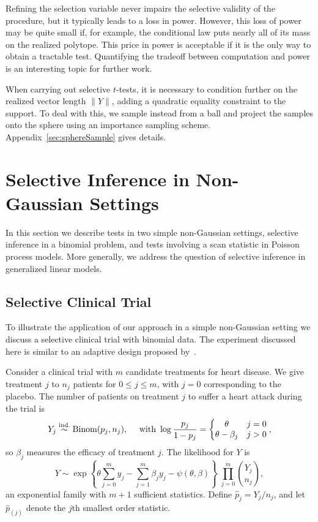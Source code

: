 \documentclass{article}
\theoremstyle{definition}
\begin{document}
Refining the selection variable never impairs the selective validity of the procedure, but it typically leads to a loss in power. However, this loss of power may be quite small if, for example, the conditional law puts nearly all of its mass on the realized polytope. This price in power is acceptable if it is the only way to obtain a tractable test. Quantifying the tradeoff between computation and power is an interesting topic for further work.

When carrying out selective $t$-tests, it is necessary to condition further on the realized vector length $\|Y\|$, adding a quadratic equality constraint to the support. To deal with this, we sample instead from a ball and project the samples onto the sphere using an importance sampling scheme. Appendix~\ref{sec:sphereSample} gives details.


\section{Selective Inference in Non-Gaussian Settings}\label{sec:examples}

In this section we describe tests in two simple non-Gaussian settings, selective inference in a binomial problem, and tests involving a scan statistic in Poisson process models. More generally, we address the question of selective inference in generalized linear models.

\subsection{Selective Clinical Trial}\label{sec:clinical}

To illustrate the application of our approach in a simple non-Gaussian setting we discuss a selective clinical trial with binomial data. The experiment discussed here is similar to an adaptive design proposed by~\citet{sill2009drop}.

Consider a clinical trial with $m$ candidate treatments for heart disease. We give treatment $j$ to $n_j$ patients for $0 \leq j \leq m$, with $j=0$ corresponding to the placebo. The number of patients on treatment $j$ to suffer a heart attack during the trial is
\begin{equation}
  Y_j \overset{\textrm{ind.}}{\sim} \text{Binom}(p_j, n_j), \quad \text{ with }   \log \frac{p_j}{1-p_j} = \left\{\begin{matrix} \theta & j = 0\\ \theta - \beta_j & j > 0\end{matrix}\right. ,
\end{equation}
so $\beta_j$ measures the efficacy of treatment $j$. The likelihood for $Y$ is
\begin{equation}
  Y \sim \exp\left\{\theta \sum_{j=0}^m y_j - \sum_{j=1}^m \beta_j y_j
    - \psi(\theta, \beta) \right\}\;\prod_{j=0}^m\binom{Y_j}{n_j},
\end{equation}
an exponential family with $m+1$ sufficient statistics. Define $\hat p_j = Y_j/n_j$, and let $\hat p_{(j)}$ denote the $j$th smallest order statistic.
\end{document}
